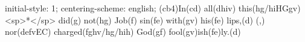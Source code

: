 initial-style: 1;
centering-scheme: english;
(cb4)In(cd) all(dhiv) this(hg/hiHGgv) <sp>*</sp> did(g) not(hg) Job(f) sin(fe) with(gv) his(fe) lips,(d) (,) nor(defvEC) charged(fghv/hg/hih) God(gf) fool(gv)ish(fe)ly.(d)
